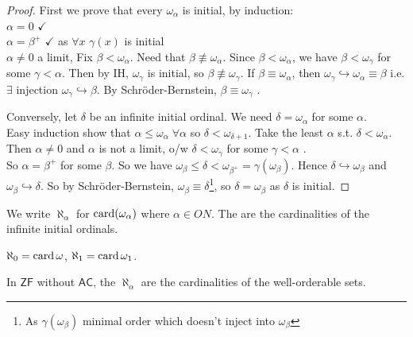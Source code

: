 \begin{proof}
    First we prove that every $\omega_\alpha$ is initial, by induction: \\
    $\alpha = 0$ $\checkmark$ \\
    $\alpha = \beta^+$ $\checkmark$ as $\forall x$ $\gamma(x)$ is initial \\
    $\alpha \neq 0$ a limit, Fix $\beta < \omega_\alpha$.
    Need that $\beta \not\equiv \omega_\alpha$.
    Since $\beta < \omega_\alpha$, we  have $\beta < \omega_\gamma$ for some $\gamma < \alpha$.
    Then by IH, $\omega_\gamma$ is initial, so $\beta \not\equiv \omega_\gamma$.
    If $\beta \equiv \omega_\alpha$, then $\omega_\gamma \hookrightarrow \omega_\alpha \equiv \beta$ i.e. $\exists$ injection $\omega_\gamma \hookrightarrow \beta$.
    By Schr\"oder-Bernstein, $\beta \equiv \omega_\gamma$ \Lightning.

    Conversely, let $\delta$ be an infinite initial ordinal.
    We need $\delta = \omega_\alpha$ for some $\alpha$. \\
    Easy induction show that $\alpha \leq \omega_\alpha \; \forall \alpha$ so $\delta < \omega_{\delta + 1}$.
    Take the least $\alpha$ s.t. $\delta < \omega_\alpha$.
    Then $\alpha \neq 0$ and $\alpha$ is not a limit, o/w $\delta < \omega_\gamma$ for some $\gamma < \alpha$ \Lightning. \\
    So $\alpha = \beta^+$ for some $\beta$.
    So we have $\omega_\beta \leq \delta < \omega_{\beta^+} = \gamma(\omega_\beta)$.
    Hence $\delta \hookrightarrow \omega_\beta$ and $\omega_\beta \hookrightarrow \delta$.
    So by Schr\"oder-Bernstein, $\omega_\beta \equiv \delta$\footnote{As $\gamma(\omega_\beta)$ minimal order which doesn't inject into $\omega_\beta$}, so $\delta = \omega_\beta$ as $\delta$ is initial.
\end{proof}

\begin{definition}
    We write $\aleph_\alpha$ for $\operatorname{card}(\omega_\alpha)$ where $\alpha \in ON$.
    The  are the cardinalities of the infinite initial ordinals.
\end{definition}

\begin{example}
    $\aleph_0 = \operatorname{card} \omega$, $\aleph_1 = \operatorname{card} \omega_1$.
\end{example}

In $\mathsf{ZF}$ without $\mathsf{AC}$, the $\aleph_\alpha$ are the cardinalities of the well-orderable sets.

